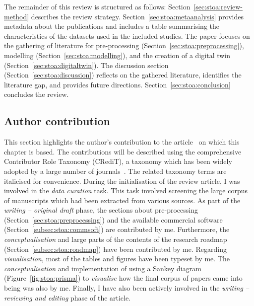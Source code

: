 The remainder of this review is structured as follows: Section~\ref{sec:stoa:review-method} describes the review strategy. Section~\ref{sec:stoa:metaanalysis} provides metadata about the publications and includes a table summarising the characteristics of the datasets used in the included studies. The paper focuses on the gathering of literature for pre-processing (Section~\ref{sec:stoa:preprocessing}), modelling (Section~\ref{sec:stoa:modelling}), and the creation of a digital twin (Section~\ref{sec:stoa:digitaltwin}). The discussion section (Section~\ref{sec:stoa:discussion}) reflects on the gathered literature, identifies the literature gap, and provides future directions. Section~\ref{sec:stoa:conclusion} concludes the review.

\subsection{Author contribution}
This section highlights the author's contribution to the article~\cite{dekker23} on which this chapter is based. The contributions will be described using the comprehensive Contributor Role Taxonomy (CRediT), a taxonomy which has been widely adopted by a large number of journals~\cite{allen2019credit}. The related taxonomy terms are italicised for convenience. During the initialisation of the review article, I was involved in the \textit{data curation} task. This task involved screening the large corpus of manuscripts which had been extracted from various sources. As part of the \textit{writing -- original draft} phase, the sections about pre-processing (Section~\ref{sec:stoa:preprocessing}) and the available commercial software (Section~\ref{subsec:stoa:commsoft}) are contributed by me. Furthermore, the \textit{conceptualisation} and large parts of the contents of the research roadmap (Section~\ref{subsec:stoa:roadmap}) have been contributed by me. Regarding \textit{visualisation}, most of the tables and figures have been typeset by me. The \textit{conceptualisation} and implementation of using a Sankey diagram~\cite{schmidt2008sankey} (Figure~\ref{fig:stoa:prisma}) to \textit{visualise} how the final corpus of papers came into being was also by me. Finally, I have also been actively involved in the \textit{writing -- reviewing and editing} phase of the article.
